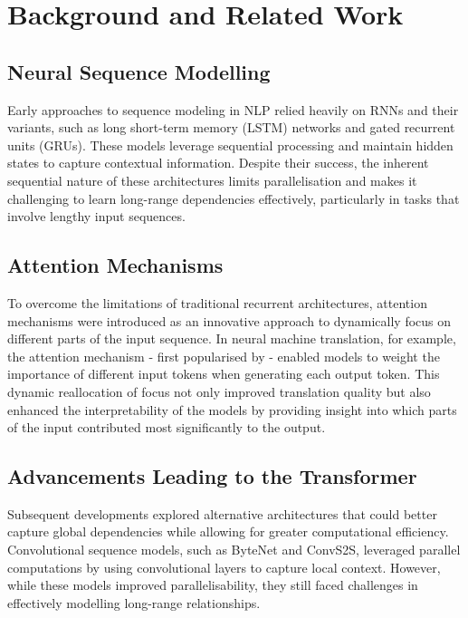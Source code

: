 \section{Background and Related Work}

\subsection{Neural Sequence Modelling}

Early approaches to sequence modeling in NLP relied heavily on RNNs and their variants, such as long short-term memory (LSTM) networks and gated recurrent units (GRUs). These models leverage sequential processing and maintain hidden states to capture contextual information. Despite their success, the inherent sequential nature of these architectures limits parallelisation and makes it challenging to learn long-range dependencies effectively, particularly in tasks that involve lengthy input sequences.

\subsection{Attention Mechanisms}

To overcome the limitations of traditional recurrent architectures, attention mechanisms were introduced as an innovative approach to dynamically focus on different parts of the input sequence. In neural machine translation, for example, the attention mechanism - first popularised by \citet{bahdanau2014neural} - enabled models to weight the importance of different input tokens when generating each output token. This dynamic reallocation of focus not only improved translation quality but also enhanced the interpretability of the models by providing insight into which parts of the input contributed most significantly to the output.

\subsection{Advancements Leading to the Transformer}

Subsequent developments explored alternative architectures that could better capture global dependencies while allowing for greater computational efficiency. Convolutional sequence models, such as ByteNet and ConvS2S, leveraged parallel computations by using convolutional layers to capture local context. However, while these models improved parallelisability, they still faced challenges in effectively modelling long-range relationships.

